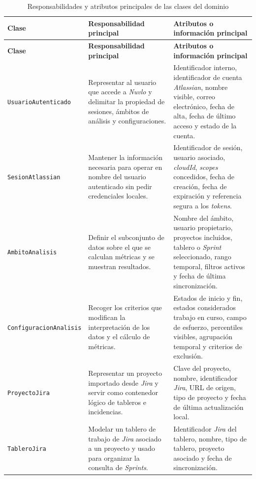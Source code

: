 \begin{landscape}
{\scriptsize
\renewcommand{\arraystretch}{1.08}
\begin{longtable}{>{\raggedright\arraybackslash}p{4.6cm}>{\raggedright\arraybackslash}p{7.6cm}>{\raggedright\arraybackslash}p{9.8cm}}
\caption{Responsabilidades y atributos principales de las clases del dominio}
\label{tab:responsabilidades-clases}\\
\toprule
\textbf{Clase} & \textbf{Responsabilidad principal} & \textbf{Atributos o información principal} \\
\midrule
\endfirsthead
\toprule
\textbf{Clase} & \textbf{Responsabilidad principal} & \textbf{Atributos o información principal} \\
\midrule
\endhead
\bottomrule
\endfoot
\texttt{UsuarioAutenticado} & Representar al usuario que accede a \textit{Nuvlo} y delimitar la propiedad de sesiones, ámbitos de análisis y configuraciones. & Identificador interno, identificador de cuenta \textit{Atlassian}, nombre visible, correo electrónico, fecha de alta, fecha de último acceso y estado de la cuenta. \\
\texttt{SesionAtlassian} & Mantener la información necesaria para operar en nombre del usuario autenticado sin pedir credenciales locales. & Identificador de sesión, usuario asociado, \textit{cloudId}, \textit{scopes} concedidos, fecha de creación, fecha de expiración y referencia segura a los \textit{tokens}. \\
\texttt{AmbitoAnalisis} & Definir el subconjunto de datos sobre el que se calculan métricas y se muestran resultados. & Nombre del ámbito, usuario propietario, proyectos incluidos, tablero o \textit{Sprint} seleccionado, rango temporal, filtros activos y fecha de última sincronización. \\
\texttt{ConfiguracionAnalisis} & Recoger los criterios que modifican la interpretación de los datos y el cálculo de métricas. & Estados de inicio y fin, estados considerados trabajo en curso, campo de esfuerzo, percentiles visibles, agrupación temporal y criterios de exclusión. \\
\texttt{ProyectoJira} & Representar un proyecto importado desde \textit{Jira} y servir como contenedor lógico de tableros e incidencias. & Clave del proyecto, nombre, identificador \textit{Jira}, URL de origen, tipo de proyecto y fecha de última actualización local. \\
\texttt{TableroJira} & Modelar un tablero de trabajo de \textit{Jira} asociado a un proyecto y usado para organizar la consulta de \textit{Sprints}. & Identificador \textit{Jira} del tablero, nombre, tipo de tablero, proyecto asociado y fecha de sincronización. \\

\end{longtable}}
\end{landscape}
